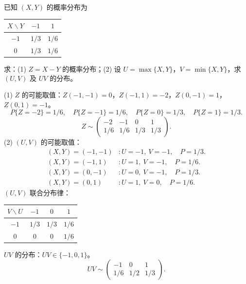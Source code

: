 \documentclass[lang=cn,11pt]{elegantbook}
\begin{document}
\begin{exercise}[离散型函数的分布] \label{exer:3-c9}
已知 $(X,Y)$ 的概率分布为
\begin{center}
\begin{tabular}{c|cc}
\toprule
$X \backslash Y$ & $-1$ & $1$ \\
\midrule
$-1$ & $1/3$ & $1/6$ \\[4pt]
$0$ & $1/3$ & $1/6$ \\
\bottomrule
\end{tabular}
\end{center}
求：(1) $Z = X - Y$ 的概率分布；(2) 设 $U = \max\{X,Y\}$，$V = \min\{X,Y\}$，求 $(U,V)$ 及 $UV$ 的分布。
\end{exercise}
\begin{solution}
(1) $Z$ 的可能取值：$Z(-1,-1)=0$，$Z(-1,1)=-2$，$Z(0,-1)=1$，$Z(0,1)=-1$。
\[
P\{Z=-2\} = 1/6,\quad P\{Z=-1\} = 1/6,\quad P\{Z=0\} = 1/3,\quad P\{Z=1\} = 1/3.
\]
\[
Z \sim \begin{pmatrix} -2 & -1 & 0 & 1 \\ 1/6 & 1/6 & 1/3 & 1/3 \end{pmatrix}.
\]
(2) $(U,V)$ 的可能取值：
\begin{align*}
(X,Y)=(-1,-1) &: U=-1,\ V=-1, \quad P = 1/3. \\
(X,Y)=(-1,1) &: U=1,\ V=-1, \quad P = 1/6. \\
(X,Y)=(0,-1) &: U=0,\ V=-1, \quad P = 1/3. \\
(X,Y)=(0,1) &: U=1,\ V=0, \quad P = 1/6.
\end{align*}
$(U,V)$ 联合分布律：
\begin{center}
\begin{tabular}{c|ccc}
\toprule
$V \backslash U$ & $-1$ & $0$ & $1$ \\
\midrule
$-1$ & $1/3$ & $1/3$ & $1/6$ \\[4pt]
$0$ & $0$ & $0$ & $1/6$ \\
\bottomrule
\end{tabular}
\end{center}
$UV$ 的分布：$UV \in \{-1, 0, 1\}$。
\[
UV \sim \begin{pmatrix} -1 & 0 & 1 \\ 1/6 & 1/2 & 1/3 \end{pmatrix}.
\]
\end{solution}
\end{document}
